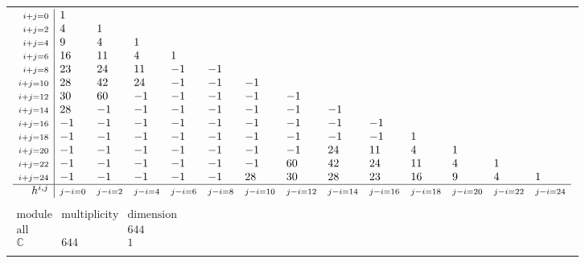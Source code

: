 \documentclass[crop,border=2mm]{standalone}
\begin{document}
\begin{tabular}{l}
$\displaystyle
\begin{array}{r|l l l l l l l l l l l l l}
	{\scriptstyle i+j=0}&1&&&&&&&&&&&&\\
	{\scriptstyle i+j=2}&4&1&&&&&&&&&&&\\
	{\scriptstyle i+j=4}&9&4&1&&&&&&&&&&\\
	{\scriptstyle i+j=6}&16&11&4&1&&&&&&&&&\\
	{\scriptstyle i+j=8}&23&24&11&-1&-1&&&&&&&&\\
	{\scriptstyle i+j=10}&28&42&24&-1&-1&-1&&&&&&&\\
	{\scriptstyle i+j=12}&30&60&-1&-1&-1&-1&-1&&&&&&\\
	{\scriptstyle i+j=14}&28&-1&-1&-1&-1&-1&-1&-1&&&&&\\
	{\scriptstyle i+j=16}&-1&-1&-1&-1&-1&-1&-1&-1&-1&&&&\\
	{\scriptstyle i+j=18}&-1&-1&-1&-1&-1&-1&-1&-1&-1&1&&&\\
	{\scriptstyle i+j=20}&-1&-1&-1&-1&-1&-1&-1&24&11&4&1&&\\
	{\scriptstyle i+j=22}&-1&-1&-1&-1&-1&-1&60&42&24&11&4&1&\\
	{\scriptstyle i+j=24}&-1&-1&-1&-1&-1&28&30&28&23&16&9&4&1\\
	\hline h^{i,j}&{\scriptstyle j-i=0}&{\scriptstyle j-i=2}&{\scriptstyle j-i=4}&{\scriptstyle j-i=6}&{\scriptstyle j-i=8}&{\scriptstyle j-i=10}&{\scriptstyle j-i=12}&{\scriptstyle j-i=14}&{\scriptstyle j-i=16}&{\scriptstyle j-i=18}&{\scriptstyle j-i=20}&{\scriptstyle j-i=22}&{\scriptstyle j-i=24}
\end{array}
$ \\ \\


$\displaystyle
\begin{array}{rll}
	\text{module}&\text{multiplicity}&\text{dimension} \\ \hline \text{all}&&644 \\
	\mathbb{C}&644&1
\end{array}
$ \\ \\

\end{tabular}
\end{document}
